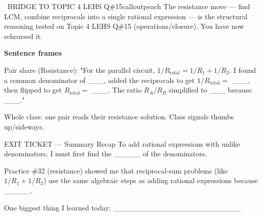 \documentclass[11pt]{article}
\begin{document}


\begin{callout}{\IconSearch\ BRIDGE TO TOPIC 4 LEHS Q\#15}{calloutpeach}
The resistance move --- find LCM, combine reciprocals into a single rational expression --- is the structural reasoning tested on Topic 4 LEHS Q\#15 (operations/closure). You have now rehearsed it.
\end{callout}

\begin{sentenceframebox}
\textbf{Sentence frames}

Pair share (Resistance): "For the parallel circuit, \(1/R_{\text{total}} = 1/R_1 + 1/R_2\). I found a common denominator of \_\_\_, added the reciprocals to get \(1/R_{\text{total}} =\) \_\_\_, then flipped to get \(R_{\text{total}} =\) \_\_\_. The ratio \(R_A/R_B\) simplified to \_\_\_ because \_\_\_."

Whole class: one pair reads their resistance solution. Class signals thumbs up/sideways.

\end{sentenceframebox}


\begin{summaryexitbox}{EXIT TICKET --- Summary Recap}
To add rational expressions with unlike denominators, I must first find the \_\_\_\_\_ of the denominators.

Practice \#32 (resistance) showed me that reciprocal-sum problems (like \(1/R_1 + 1/R_2\)) use the same algebraic steps as adding rational expressions because \_\_\_\_\_.

One biggest thing I learned today: \_\_\_\_\_\_\_\_\_\_\_\_\_\_\_\_\_\_\_\_\_\_\_\_

\end{summaryexitbox}

\clearpage


\end{document}
